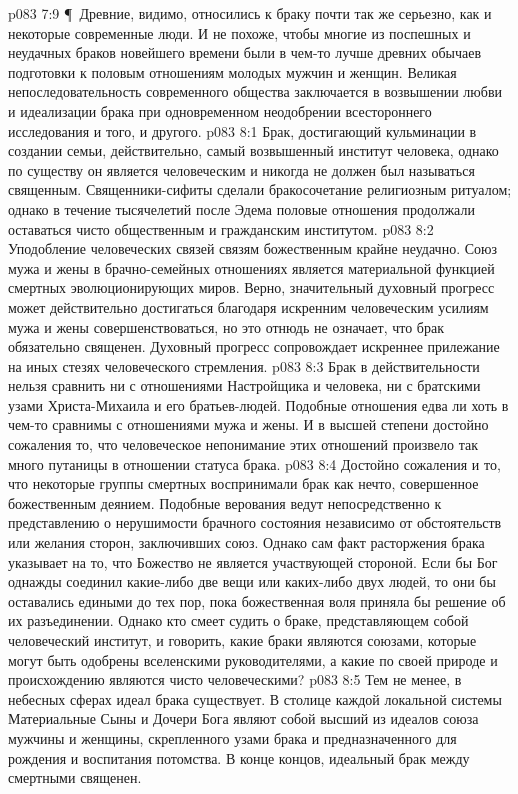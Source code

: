 \vs p083 7:9 \P\ Древние, видимо, относились к браку почти так же серьезно, как и некоторые современные люди. И не похоже, чтобы многие из поспешных и неудачных браков новейшего времени были в чем\hyp{}то лучше древних обычаев подготовки к половым отношениям молодых мужчин и женщин. Великая непоследовательность современного общества заключается в возвышении любви и идеализации брака при одновременном неодобрении всестороннего исследования и того, и другого.
\vs p083 8:1 Брак, достигающий кульминации в создании семьи, действительно, самый возвышенный институт человека, однако по существу он является человеческим и никогда не должен был называться священным. Священники\hyp{}сифиты сделали бракосочетание религиозным ритуалом; однако в течение тысячелетий после Эдема половые отношения продолжали оставаться чисто общественным и гражданским институтом.
\vs p083 8:2 Уподобление человеческих связей связям божественным крайне неудачно. Союз мужа и жены в брачно\hyp{}семейных отношениях является материальной функцией смертных эволюционирующих миров. Верно, значительный духовный прогресс может действительно достигаться благодаря искренним человеческим усилиям мужа и жены совершенствоваться, но это отнюдь не означает, что брак обязательно священен. Духовный прогресс сопровождает искреннее прилежание на иных стезях человеческого стремления.
\vs p083 8:3 Брак в действительности нельзя сравнить ни с отношениями Настройщика и человека, ни с братскими узами Христа\hyp{}Михаила и его братьев\hyp{}людей. Подобные отношения едва ли хоть в чем\hyp{}то сравнимы с отношениями мужа и жены. И в высшей степени достойно сожаления то, что человеческое непонимание этих отношений произвело так много путаницы в отношении статуса брака.
\vs p083 8:4 Достойно сожаления и то, что некоторые группы смертных воспринимали брак как нечто, совершенное божественным деянием. Подобные верования ведут непосредственно к представлению о нерушимости брачного состояния независимо от обстоятельств или желания сторон, заключивших союз. Однако сам факт расторжения брака указывает на то, что Божество не является участвующей стороной. Если бы Бог однажды соединил какие\hyp{}либо две вещи или каких\hyp{}либо двух людей, то они бы оставались едиными до тех пор, пока божественная воля приняла бы решение об их разъединении. Однако кто смеет судить о браке, представляющем собой человеческий институт, и говорить, какие браки являются союзами, которые могут быть одобрены вселенскими руководителями, а какие по своей природе и происхождению являются чисто человеческими?
\vs p083 8:5 Тем не менее, в небесных сферах идеал брака существует. В столице каждой локальной системы Материальные Сыны и Дочери Бога являют собой высший из идеалов союза мужчины и женщины, скрепленного узами брака и предназначенного для рождения и воспитания потомства. В конце концов, идеальный брак между смертными  священен.

